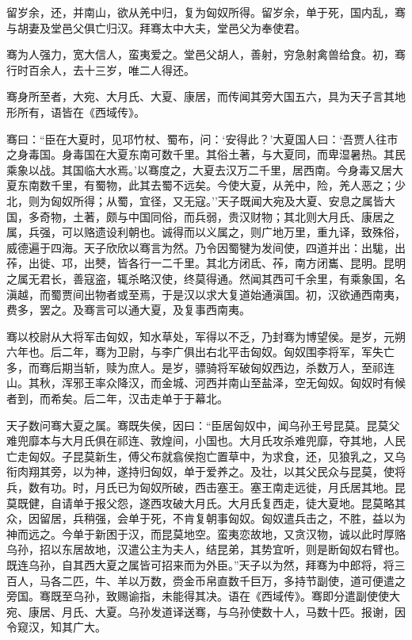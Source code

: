 \documentclass[]{article}
\begin{document}
留岁余，还，并南山，欲从羌中归，复为匈奴所得。留岁余，单于死，国内乱，骞与胡妻及堂邑父俱亡归汉。拜骞太中大夫，堂邑父为奉使君。

骞为人强力，宽大信人，蛮夷爱之。堂邑父胡人，善射，穷急射禽兽给食。初，骞行时百余人，去十三岁，唯二人得还。

骞身所至者，大宛、大月氏、大夏、康居，而传闻其旁大国五六，具为天子言其地形所有，语皆在《西域传》。

骞曰：``臣在大夏时，见邛竹杖、蜀布，问：`安得此？'大夏国人曰：`吾贾人往市之身毒国。身毒国在大夏东南可数千里。其俗土著，与大夏同，而卑湿暑热。其民乘象以战。其国临大水焉。'以骞度之，大夏去汉万二千里，居西南。今身毒又居大夏东南数千里，有蜀物，此其去蜀不远矣。今使大夏，从羌中，险，羌人恶之；少北，则为匈奴所得；从蜀，宜径，又无寇。''天子既闻大宛及大夏、安息之属皆大国，多奇物，土著，颇与中国同俗，而兵弱，贵汉财物；其北则大月氏、康居之属，兵强，可以赂遗设利朝也。诚得而以义属之，则广地万里，重九译，致殊俗，威德遍于四海。天子欣欣以骞言为然。乃令因蜀犍为发间使，四道并出：出駹，出莋，出徙、邛，出僰，皆各行一二千里。其北方闭氐、莋，南方闭巂、昆明。昆明之属无君长，善寇盗，辄杀略汉使，终莫得通。然闻其西可千余里，有乘象国，名滇越，而蜀贾间出物者或至焉，于是汉以求大复道始通滇国。初，汉欲通西南夷，费多，罢之。及骞言可以通大夏，及复事西南夷。

骞以校尉从大将军击匈奴，知水草处，军得以不乏，乃封骞为博望侯。是岁，元朔六年也。后二年，骞为卫尉，与李广俱出右北平击匈奴。匈奴围李将军，军失亡多，而骞后期当斩，赎为庶人。是岁，骠骑将军破匈奴西边，杀数万人，至祁连山。其秋，浑邪王率众降汉，而金城、河西并南山至盐泽，空无匈奴。匈奴时有候者到，而希矣。后二年，汉击走单于于幕北。

天子数问骞大夏之属。骞既失侯，因曰：``臣居匈奴中，闻乌孙王号昆莫。昆莫父难兜靡本与大月氏俱在祁连、敦煌间，小国也。大月氏攻杀难兜靡，夺其地，人民亡走匈奴。子昆莫新生，傅父布就翕侯抱亡置草中，为求食，还，见狼乳之，又乌衔肉翔其旁，以为神，遂持归匈奴，单于爱养之。及壮，以其父民众与昆莫，使将兵，数有功。时，月氏已为匈奴所破，西击塞王。塞王南走远徙，月氏居其地。昆莫既健，自请单于报父怨，遂西攻破大月氏。大月氏复西走，徒大夏地。昆莫略其众，因留居，兵稍强，会单于死，不肯复朝事匈奴。匈奴遣兵击之，不胜，益以为神而远之。今单于新困于汉，而昆莫地空。蛮夷恋故地，又贪汉物，诚以此时厚赂乌孙，招以东居故地，汉遣公主为夫人，结昆弟，其势宜听，则是断匈奴右臂也。既连乌孙，自其西大夏之属皆可招来而为外臣。''天子以为然，拜骞为中郎将，将三百人，马各二匹，牛、羊以万数，赍金币帛直数千巨万，多持节副使，道可便遣之旁国。骞既至乌孙，致赐谕指，未能得其决。语在《西域传》。骞即分遣副使使大宛、康居、月氏、大夏。乌孙发道译送骞，与乌孙使数十人，马数十匹。报谢，因令窥汉，知其广大。
\end{document}

